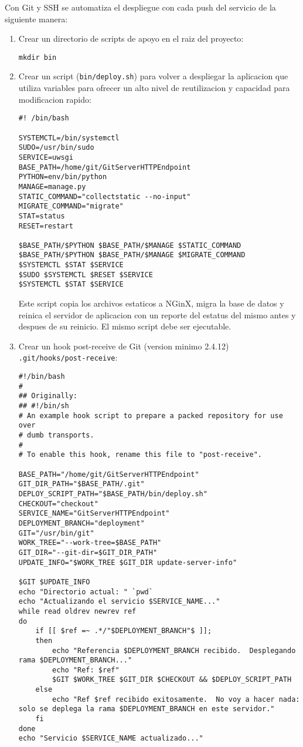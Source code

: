 Con Git y SSH se automatiza el despliegue con cada push del servicio de la siguiente manera:
\begin{enumerate}
	\item Crear un directorio de scripts de apoyo en el raiz del proyecto:
    \begin{lstlisting}
mkdir bin
    \end{lstlisting}
    \item Crear un script (\texttt{bin/deploy.sh}) para volver a despliegar la aplicacion que utiliza variables para ofrecer un alto nivel de reutilizacion y capacidad para modificacion rapido:
    \begin{lstlisting}
#! /bin/bash

SYSTEMCTL=/bin/systemctl
SUDO=/usr/bin/sudo
SERVICE=uwsgi
BASE_PATH=/home/git/GitServerHTTPEndpoint
PYTHON=env/bin/python
MANAGE=manage.py
STATIC_COMMAND="collectstatic --no-input"
MIGRATE_COMMAND="migrate"
STAT=status
RESET=restart

$BASE_PATH/$PYTHON $BASE_PATH/$MANAGE $STATIC_COMMAND
$BASE_PATH/$PYTHON $BASE_PATH/$MANAGE $MIGRATE_COMMAND
$SYSTEMCTL $STAT $SERVICE
$SUDO $SYSTEMCTL $RESET $SERVICE
$SYSTEMCTL $STAT $SERVICE
    \end{lstlisting}
    Este script copia los archivos estaticos a NGinX, migra la base de datos y reinica el servidor de aplicacion con un reporte del estatus del mismo antes y despues de su reinicio. El mismo script debe ser ejecutable.
    \item Crear un hook post-receive de Git (version minimo 2.4.12) \\
    \texttt{.git/hooks/post-receive}:
    \begin{lstlisting}[breaklines=true]
#!/bin/bash
#
## Originally:
## #!/bin/sh
# An example hook script to prepare a packed repository for use over
# dumb transports.
#
# To enable this hook, rename this file to "post-receive".

BASE_PATH="/home/git/GitServerHTTPEndpoint"
GIT_DIR_PATH="$BASE_PATH/.git"
DEPLOY_SCRIPT_PATH="$BASE_PATH/bin/deploy.sh"
CHECKOUT="checkout"
SERVICE_NAME="GitServerHTTPEndpoint"
DEPLOYMENT_BRANCH="deployment"
GIT="/usr/bin/git"
WORK_TREE="--work-tree=$BASE_PATH"
GIT_DIR="--git-dir=$GIT_DIR_PATH"
UPDATE_INFO="$WORK_TREE $GIT_DIR update-server-info"

$GIT $UPDATE_INFO
echo "Directorio actual: " `pwd`
echo "Actualizando el servicio $SERVICE_NAME..."
while read oldrev newrev ref
do
    if [[ $ref =~ .*/"$DEPLOYMENT_BRANCH"$ ]];
    then
        echo "Referencia $DEPLOYMENT_BRANCH recibido.  Desplegando rama $DEPLOYMENT_BRANCH..."
        echo "Ref: $ref"
        $GIT $WORK_TREE $GIT_DIR $CHECKOUT && $DEPLOY_SCRIPT_PATH
    else
        echo "Ref $ref recibido exitosamente.  No voy a hacer nada: solo se deplega la rama $DEPLOYMENT_BRANCH en este servidor."
    fi
done
echo "Servicio $SERVICE_NAME actualizado..."


\end{lstlisting}
\end{enumerate}
